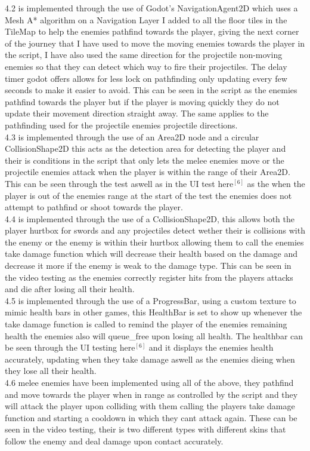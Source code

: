 \documentclass{article}
\begin{document}
        4.2 is implemented through the use of Godot's NavigationAgent2D which uses a Mesh A* algorithm on a Navigation Layer I added to all the floor tiles in the TileMap to help the enemies pathfind towards the player, giving the next corner of the journey that I have used to move the moving enemies towards the player in the script, I have also used the same direction for the projectile non-moving enemies so that they can detect which way to fire their projectiles. The delay timer godot offers allows for less lock on pathfinding only updating every few seconds to make it easier to avoid. This can be seen in the script as the enemies pathfind towards the player but if the player is moving quickly they do not update their movement direction straight away. The same applies to the pathfinding used for the projectile enemies projectile directions.\\
        4.3 is implemented through the use of an Area2D node and a circular CollisionShape2D this acts as the detection area for detecting the player and their is conditions in the script that only lets the melee enemies move or the projectile enemies attack when the player is within the range of their Area2D. This can be seen through the test aswell as in the UI test here$^{[6]}$ as the when the player is out of the enemies range at the start of the test the enemies does not attempt to pathfind or shoot towards the player.\\
        4.4 is implemented through the use of a CollisionShape2D, this allows both the player hurtbox for swords and any projectiles detect wether their is collisions with the enemy or the enemy is within their hurtbox allowing them to call the enemies take damage function which will decrease their health based on the damage and decrease it more if the enemy is weak to the damage type. This can be seen in the video testing as the enemies correctly register hits from the players attacks and die after losing all their health.\\
        4.5 is implemented through the use of a ProgressBar, using a custom texture to mimic health bars in other games, this HealthBar is set to show up whenever the take damage function is called to remind the player of the enemies remaining health the enemies also will queue\_free upon losing all health. The healthbar can be seen through the UI testing here$^{[6]}$ and it displays the enemies health accurately, updating when they take damage aswell as the enemies dieing when they lose all their health.\\
        4.6 melee enemies have been implemented using all of the above, they pathfind and move towards the player when in range as controlled by the script and they will attack the player upon colliding with them calling the players take damage function and starting a cooldown in which they cant attack again. These can be seen in the video testing, their is two different types with different skins that follow the enemy and deal damage upon contact accurately.\\
\end{document}
